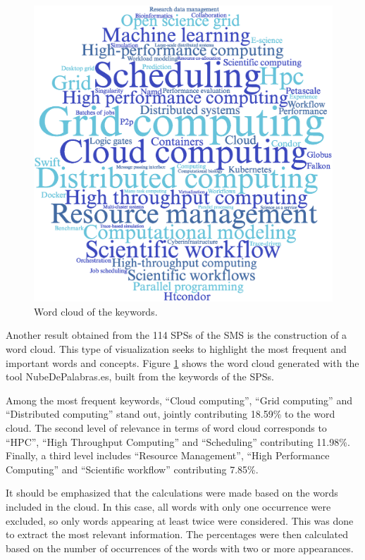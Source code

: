 \begin{figure}
	\centering
	\includegraphics[scale=0.4]{resources/figures/wordcloud.eps}
	\caption{Word cloud of the keywords.}
	\label{fig:WordCloud}
\end{figure}

Another result obtained from the 114 SPSs of the SMS is the construction of a word cloud. This type of visualization seeks to highlight the most frequent and important words and concepts. Figure \ref{fig:WordCloud} shows the word cloud generated with the tool NubeDePalabras.es, built from the keywords of the SPSs.

Among the most frequent keywords, ``Cloud computing'', ``Grid computing'' and ``Distributed computing'' stand out, jointly contributing 18.59\% to the word cloud. The second level of relevance in terms of word cloud corresponds to ``HPC'', ``High Throughput Computing'' and ``Scheduling'' contributing 11.98\%. Finally, a third level includes ``Resource Management'', ``High Performance Computing'' and ``Scientific workflow'' contributing 7.85\%.

It should be emphasized that the calculations were made based on the words included in the cloud. In this case, all words with only one occurrence were excluded, so only words appearing at least twice were considered. This was done to extract the most relevant information. The percentages were then calculated based on the number of occurrences of the words with two or more appearances.
